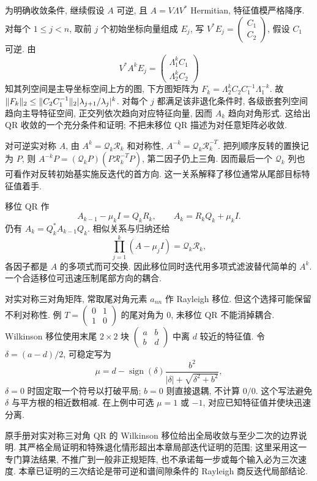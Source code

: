 为明确收敛条件, 继续假设 $A$ 可逆, 且 $A=V\Lambda V^*$ Hermitian, 特征值模严格降序. 对每个 $1\le j<n$, 取前 $j$ 个初始坐标向量组成 $E_j$, 写 $V^*E_j=\begin{pmatrix}C_1\\C_2\end{pmatrix}$, 假设 $C_1$ 可逆. 由
\[
V^*A^kE_j=\begin{pmatrix}\Lambda_1^kC_1\\\Lambda_2^kC_2\end{pmatrix}
\]
知其列空间是主导坐标空间上方的图, 下方图矩阵为
$F_k=\Lambda_2^kC_2C_1^{-1}\Lambda_1^{-k}$.
故 $\lVert F_k\rVert_2\le\lVert C_2C_1^{-1}\rVert_2|\lambda_{j+1}/\lambda_j|^k$.
对每个 $j$ 都满足该非退化条件时, 各级嵌套列空间趋向主导特征空间, 正交列依次趋向对应特征向量, 因而 $A_k$ 趋向对角形式. 这给出 QR 收敛的一个充分条件和证明; 不把未移位 QR 描述为对任意矩阵必收敛.

对可逆实对称 $A$, 由 $A^k=\mathcal Q_k\mathcal R_k$ 和对称性,
$A^{-k}=\mathcal Q_k\mathcal R_k^{-T}$.
把列顺序反转的置换记为 $P$, 则
$A^{-k}P=(\mathcal Q_kP)(P\mathcal R_k^{-T}P)$,
第二因子仍上三角. 因而最后一个 $\mathcal Q_k$ 列也可看作对反转初始基实施反迭代的首方向. 这一关系解释了移位通常从尾部目标特征值着手.

移位 QR 作
\[
A_{k-1}-\mu_kI=Q_kR_k,\qquad
A_k=R_kQ_k+\mu_kI.
\]
仍有 $A_k=Q_k^*A_{k-1}Q_k$. 相似关系与归纳还给
\[
\prod_{j=1}^k(A-\mu_jI)=\mathcal Q_k\mathcal R_k,
\]
各因子都是 $A$ 的多项式而可交换. 因此移位同时迭代用多项式滤波替代简单的 $A^k$. 一个合适移位可迅速压制尾部方向的耦合.

对实对称三对角矩阵, 常取尾对角元素 $a_{nn}$ 作 Rayleigh 移位. 但这个选择可能保留不利对称性. 例 $T=\begin{pmatrix}0&1\\1&0\end{pmatrix}$ 的尾对角为 $0$, 未移位 QR 不能消掉耦合. Wilkinson 移位使用末尾 $2\times2$ 块
$\begin{pmatrix}a&b\\b&d\end{pmatrix}$ 中离 $d$ 较近的特征值. 令 $\delta=(a-d)/2$, 可稳定写为
\[
\mu=d-\operatorname{sign}(\delta)
\frac{b^2}{|\delta|+\sqrt{\delta^2+b^2}},
\]
$\delta=0$ 时固定取一个符号以打破平局; $b=0$ 则直接退耦, 不计算 $0/0$. 这个写法避免 $\delta$ 与平方根的相近数相减. 在上例中可选 $\mu=1$ 或 $-1$, 对应已知特征值并使块迅速分离.

原手册对实对称三对角 QR 的 Wilkinson 移位给出全局收敛与至少二次的边界说明. 其严格全局证明和特殊退化情形超出本章局部迭代证明的范围; 这里采用这一专门算法结果, 不推广到一般非正规矩阵, 也不承诺每一步或每个输入必为三次速度. 本章已证明的三次结论是带可逆和谱间隙条件的 Rayleigh 商反迭代局部结论.


